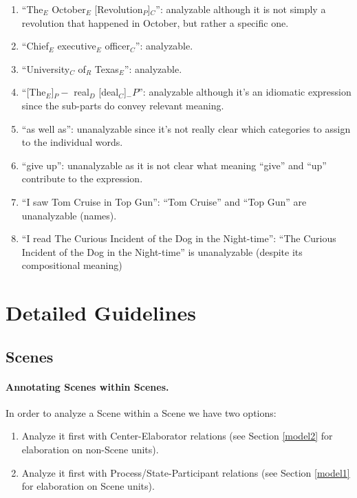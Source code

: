 \documentclass[11pt]{article}
\newcommand{\oa}[1]{{\color{blue}{OA: #1}}}
\newcommand{\nss}[1]{}
\begin{document}
\begin{enumerate}
\item
``The$_E$ October$_E$ [Revolution$_P$]$_C$'': analyzable although it is not
simply a revolution that happened in October, but rather a specific one.
\item
``Chief$_E$ executive$_E$ officer$_C$'': analyzable.
\item
``University$_C$ of$_R$ Texas$_E$'': analyzable.
\item
``[The$_E$]$_P-$ real$_D$ [deal$_C$]$_-P$'':
analyzable although it's an idiomatic expression
since the sub-parts do convey relevant meaning.

\item
``as well as'': unanalyzable since it's not really clear which
categories to assign to the individual words.
\item
``give up'': unanalyzable as it is not clear what meaning ``give'' and ``up'' contribute to the expression.
\item
``I saw Tom Cruise in Top Gun'': ``Tom Cruise'' and ``Top Gun'' are unanalyzable (names). 
\item
``I read The Curious Incident of the Dog in the Night-time'': ``The Curious Incident of the Dog in the Night-time'' is unanalyzable (despite its compositional meaning)
\end{enumerate}


\section{Detailed Guidelines}


\subsection{Scenes}

\paragraph{Annotating Scenes within Scenes.} 
In order to analyze a Scene within a Scene we have two options: 

\begin{enumerate}
\item Analyze it first with Center-Elaborator relations (see Section \ref{model2} for elaboration on non-Scene units).
\item Analyze it first with Process/State-Participant relations (see Section \ref {model1} for elaboration on Scene units). 
\end {enumerate}
\end{document}
